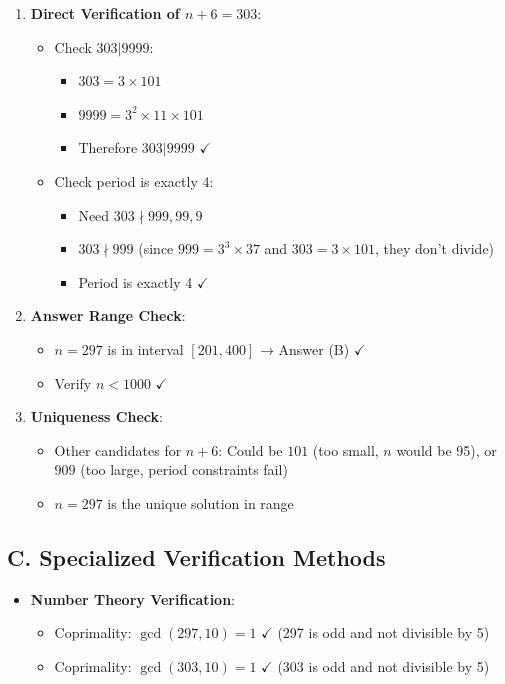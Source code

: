 \documentclass[11pt]{article}
\begin{document}
\begin{verificationbox}
\begin{enumerate}[leftmargin=*]
    \item \textbf{Direct Verification of $n+6 = 303$}:
    \begin{itemize}
        \item Check $303 | 9999$:
        \begin{itemize}
            \item $303 = 3 \times 101$
            \item $9999 = 3^2 \times 11 \times 101$
            \item Therefore $303 | 9999$ $\checkmark$
        \end{itemize}
        
        \item Check period is exactly 4:
        \begin{itemize}
            \item Need $303 \nmid 999, 99, 9$
            \item $303 \nmid 999$ (since $999 = 3^3 \times 37$ and $303 = 3 \times 101$, they don't divide)
            \item Period is exactly 4 $\checkmark$
        \end{itemize}
    \end{itemize}
    
    \item \textbf{Answer Range Check}:
    \begin{itemize}
        \item $n = 297$ is in interval $[201, 400]$ → Answer (B) $\checkmark$
        \item Verify $n < 1000$ $\checkmark$
    \end{itemize}
    
    \item \textbf{Uniqueness Check}:
    \begin{itemize}
        \item Other candidates for $n+6$: Could be $101$ (too small, $n$ would be 95), or $909$ (too large, period constraints fail)
        \item $n = 297$ is the unique solution in range
    \end{itemize}
\end{enumerate}

\subsection*{C. Specialized Verification Methods}
\begin{itemize}[leftmargin=*]
    \item \textbf{Number Theory Verification}:
    \begin{itemize}
        \item Coprimality: $\gcd(297, 10) = 1$ $\checkmark$ (297 is odd and not divisible by 5)
        \item Coprimality: $\gcd(303, 10) = 1$ $\checkmark$ (303 is odd and not divisible by 5)
    \end{itemize}
    

\end{itemize}
\end{verificationbox}
\end{document}
